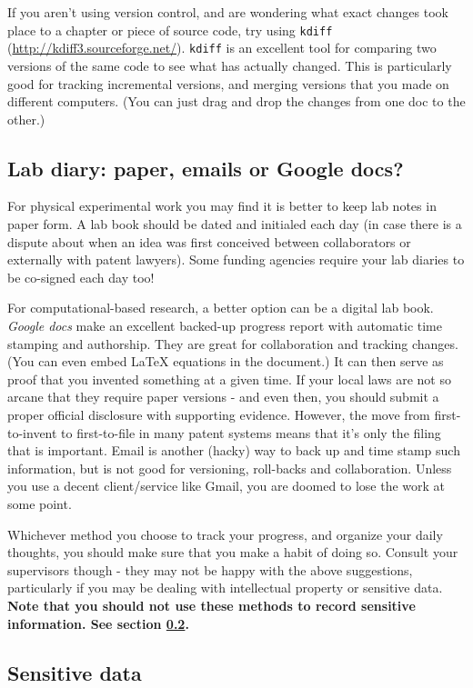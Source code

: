 If you aren't using version control, and are wondering what exact changes took place to a chapter or
piece of source code, try using \verb|kdiff|
(\url{http://kdiff3.sourceforge.net/}).
\verb|kdiff| is an excellent tool for comparing two versions of the same 
code to see what has actually changed. This is particularly good 
for tracking incremental versions, and merging versions that you made
on different computers. (You can just drag and drop the changes 
from one doc to the other.)

\subsection{Lab diary: paper, emails or Google docs?}
\label{Lab_diaries}

For physical experimental work you may find it is better to keep
lab notes in paper form. A lab book should be dated and initialed
each day (in case there is a dispute about when an idea was first
conceived between collaborators or externally with patent lawyers). Some funding agencies require your lab diaries to
be co-signed each day too!

For computational-based research, a better option can be a digital
lab book. {\it Google docs} make an excellent backed-up progress report
with automatic time stamping and authorship. They are great for 
collaboration and tracking changes. (You can even embed \LaTeX 
equations in the document.) It can then serve as proof that you invented something at a given time. If your local laws are not so arcane that they require paper versions - and even then, you should submit a proper official disclosure with supporting evidence. However, the move from first-to-invent to first-to-file in many patent systems means that it's only the filing that is important. Email is another (hacky) way to back up and time stamp such information, but is not good for versioning, roll-backs and collaboration. Unless you use a decent client/service like Gmail, you are doomed to lose the work at some point. 

Whichever method you choose to track your progress, and organize
your daily thoughts, you should make sure that you make a habit
of doing so. Consult your supervisors though - they may not
be happy with the above suggestions, particularly if you may be
dealing with intellectual property or sensitive data.
{\bf Note that you should not use these methods to record sensitive information. See section \ref{sec:encrypt}. }

\subsection{Sensitive data}
\label{sec:encrypt}

